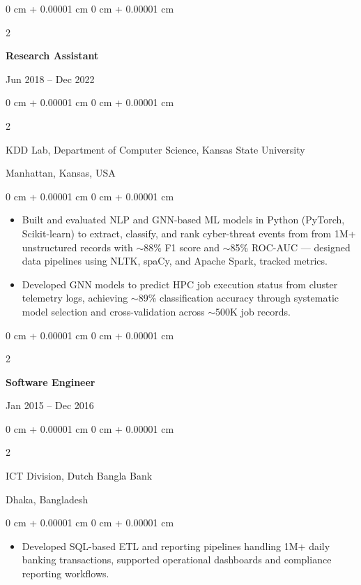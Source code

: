 \documentclass[10pt, letterpaper]{article}
\newenvironment{highlights}{
    \begin{itemize}[
        topsep=0.10 cm,
        parsep=0.10 cm,
        partopsep=0pt,
        itemsep=0pt,
        leftmargin=0 cm + 10pt
    ]
}{
    \end{itemize}
} %
\newenvironment{onecolentry}{
    \begin{adjustwidth}{
        0 cm + 0.00001 cm
    }{
        0 cm + 0.00001 cm
    }
}{
    \end{adjustwidth}
} %
\newenvironment{twocolentry}[2][]{
    \onecolentry
    \def\secondColumn{#2}
    \setcolumnwidth{\fill, 4.5 cm}
    \begin{paracol}{2}
}{
    \switchcolumn \raggedleft \secondColumn
    \end{paracol}
    \endonecolentry
} %
\begin{document}
    \vspace{1mm}

    \begin{twocolentry}{Jun 2018 -- Dec 2022}
        \textbf{Research Assistant}
    \end{twocolentry}
    \begin{twocolentry}{Manhattan, Kansas, USA}
       KDD Lab, Department of Computer Science, Kansas State University
    \end{twocolentry}
    \vspace{0.10 cm}
    \begin{onecolentry}
        \begin{highlights}
            \item Built and evaluated NLP and GNN-based ML models in Python (PyTorch, Scikit-learn) to extract, classify, and rank cyber-threat events from from 1M+ unstructured records with $\sim$88\% F1 score and $\sim$85\% ROC-AUC — designed data pipelines using NLTK, spaCy, and Apache Spark, tracked metrics.
            \item Developed GNN models to predict HPC job execution status from cluster telemetry logs, achieving $\sim$89\% classification accuracy through systematic model selection and cross-validation across $\sim$500K job records.
        \end{highlights}
    \end{onecolentry}

    \vspace{0.1 cm}
    \begin{twocolentry}{Jan 2015 -- Dec 2016}
        \textbf{Software Engineer}
    \end{twocolentry}
    \begin{twocolentry}{Dhaka, Bangladesh}
       ICT Division, Dutch Bangla Bank
    \end{twocolentry}

    \begin{onecolentry}
        \begin{highlights}
            \item Developed SQL-based ETL and reporting pipelines handling 1M+ daily banking transactions, supported operational dashboards and compliance reporting workflows.
        \end{highlights}
    \end{onecolentry}

\end{document}
